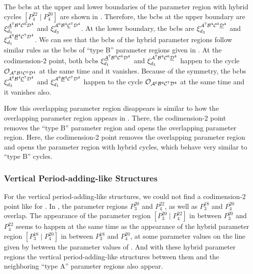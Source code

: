 The \glspl{bcb} at the upper and lower boundaries of the parameter region with hybrid cycles $\left[P^{22}_4 \mid P^{20}_4\right]$ are shown in .
Therefore, the \glspl{bcb} at the upper boundary are $\xi_{d_1}^{\underline{\mathcal{A}}^7\mathcal{B}^4\mathcal{C}^6\mathcal{D}^4}$ and $\xi_{d_3}^{\mathcal{A}^6\mathcal{B}^4\underline{\mathcal{C}}^7\mathcal{D}^4}$.
At the lower boundary, the \glspl{bcb} are $\xi_{d_3}^{\mathcal{A}^7\mathcal{B}^4\mathcal{C}^6\underline{\mathcal{D}}^4}$ and $\xi_{d_1}^{\mathcal{A}^6\underline{\mathcal{B}}^4\mathcal{C}^7\mathcal{D}^4}$.
We can see that the \glspl{bcb} of the hybrid parameter regions follow similar rules as the \glspl{bcb} of ``type B'' parameter regions given in .
At the codimension-2 point, both \glspl{bcb} $\xi_{d_1}^{\underline{\mathcal{A}}^7\mathcal{B}^4\mathcal{C}^6\mathcal{D}^4}$ and $\xi_{d_3}^{\mathcal{A}^7\mathcal{B}^4\mathcal{C}^6\underline{\mathcal{D}}^4}$ happen to the cycle $\mathcal{O}_{\mathcal{A}^7\mathcal{B}^4\mathcal{C}^6\mathcal{D}^4}$ at the same time and it vanishes.
Because of the symmetry, the \glspl{bcb} $\xi_{d_3}^{\mathcal{A}^6\mathcal{B}^4\underline{\mathcal{C}}^7\mathcal{D}^4}$ and $\xi_{d_1}^{\mathcal{A}^6\underline{\mathcal{B}}^4\mathcal{C}^7\mathcal{D}^4}$ happen to the cycle $\mathcal{O}_{\mathcal{A}^6\mathcal{B}^4\mathcal{C}^7\mathcal{D}^4}$ at the same time and it vanishes also.

How this overlapping parameter region disappears is similar to how the overlapping parameter region appears in .
There, the codimension-2 point removes the ``type B'' parameter region and opens the overlapping parameter region.
Here, the codimension-2 point removes the overlapping parameter region and opens the parameter region with hybrid cycles, which behave very similar to ``type B'' cycles.

\subsubsection{Vertical Period-adding-like Structures}
\label{sec:add.change.appa.vert}

For the vertical period-adding-like structures, we could not find a codimension-2 point like for .
In , the parameter regions $P^{20}_3$ and $P^{22}_4$, as well as $P^{18}_3$ and $P^{20}_4$ overlap.
The appearance of the parameter region $\left[P^{20}_3 \mid P^{22}_4\right]$ in between $P^{20}_3$ and $P^{22}_4$ seems to happen at the same time as the appearance of the hybrid parameter region $\left[P^{18}_3 \mid P^{20}_4\right]$ in between $P^{18}_3$ and $P^{20}_4$, at some parameter values on the line given by  between the parameter values of .
And with these hybrid parameter regions the vertical period-adding-like structures between them and the neighboring ``type A'' parameter regions also appear.

